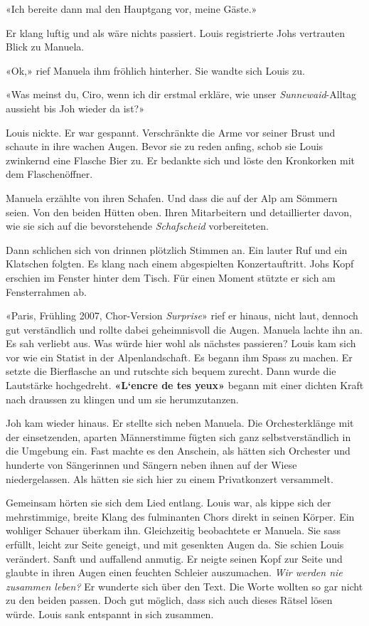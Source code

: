 «Ich bereite dann mal den Hauptgang vor, meine Gäste.»

Er klang luftig und als wäre nichts passiert. Louis registrierte Johs
vertrauten Blick zu Manuela.

«Ok,» rief Manuela ihm fröhlich hinterher. Sie wandte sich Louis zu.

«Was meinst du, Ciro, wenn ich dir erstmal erkläre, wie unser
\emph{Sunnewaid}-Alltag aussieht bis Joh wieder da ist?»

Louis nickte. Er war gespannt. Verschränkte die Arme vor seiner Brust
und schaute in ihre wachen Augen. Bevor sie zu reden anfing, schob sie
Louis zwinkernd eine Flasche Bier zu. Er bedankte sich und löste den
Kronkorken mit dem Flaschenöffner.

Manuela erzählte von ihren Schafen. Und dass die auf der Alp am Sömmern
seien. Von den beiden Hütten oben. Ihren Mitarbeitern und detaillierter
davon, wie sie sich auf die bevorstehende \emph{Schafscheid}
vorbereiteten.

Dann schlichen sich von drinnen plötzlich Stimmen an. Ein lauter Ruf und
ein Klatschen folgten. Es klang nach einem abgespielten Konzertauftritt.
Johs Kopf erschien im Fenster hinter dem Tisch. Für einen Moment stützte
er sich am Fensterrahmen ab.

«Paris, Frühling 2007, Chor-Version \emph{Surprise}» rief er hinaus,
nicht laut, dennoch gut verständlich und rollte dabei geheimnisvoll die
Augen. Manuela lachte ihn an. Es sah verliebt aus. Was würde hier wohl
als nächstes passieren? Louis kam sich vor wie ein Statist in der
Alpenlandschaft. Es begann ihm Spass zu machen. Er setzte die
Bierflasche an und rutschte sich bequem zurecht. Dann wurde die
Lautstärke hochgedreht. \textbf{«L`encre de tes yeux»} begann mit einer
dichten Kraft nach draussen zu klingen und um sie herumzutanzen.

Joh kam wieder hinaus. Er stellte sich neben Manuela. Die
Orchesterklänge mit der einsetzenden, aparten Männerstimme fügten sich
ganz selbstverständlich in die Umgebung ein. Fast machte es den
Anschein, als hätten sich Orchester und hunderte von Sängerinnen und
Sängern neben ihnen auf der Wiese niedergelassen. Als hätten sie sich
hier zu einem Privatkonzert versammelt.

Gemeinsam hörten sie sich dem Lied entlang. Louis war, als kippe sich
der mehrstimmige, breite Klang des fulminanten Chors direkt in seinen
Körper. Ein wohliger Schauer überkam ihn. Gleichzeitig beobachtete er
Manuela. Sie sass erfüllt, leicht zur Seite geneigt, und mit gesenkten
Augen da. Sie schien Louis verändert. Sanft und auffallend anmutig. Er
neigte seinen Kopf zur Seite und glaubte in ihren Augen einen feuchten
Schleier auszumachen. \emph{Wir werden nie zusammen leben?} Er wunderte
sich über den Text. Die Worte wollten so gar nicht zu den beiden passen.
Doch gut möglich, dass sich auch dieses Rätsel lösen würde. Louis sank
entspannt in sich zusammen.

